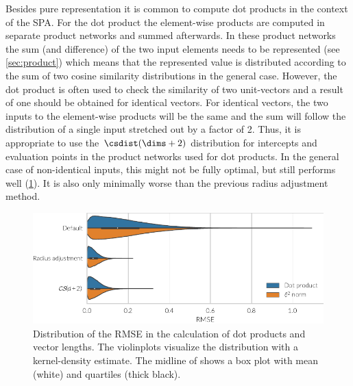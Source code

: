 Besides pure representation it is common to compute dot products in the context of the SPA\@.
For the dot product the element-wise products are computed in separate product networks and summed afterwards.
In these product networks the sum (and difference) of the two input elements needs to be represented (see \cref{sec:product}) which means that the represented value is distributed according to the sum of two cosine similarity distributions in the general case.
However, the dot product is often used to check the similarity of two unit-vectors and a result of one should be obtained for identical vectors.
For identical vectors, the two inputs to the element-wise products will be the same and the sum will follow the distribution of a single input stretched out by a factor of 2.
Thus, it is appropriate to use the $\csdist(\dims + 2)$ distribution for intercepts and evaluation points in the product networks used for dot products.
In the general case of non-identical inputs, this might not be fully optimal, but still performs well (\cref{fig:spaopt-dot}).
It is also only minimally worse than the previous radius adjustment method.
\begin{figure}
    \centering
    \includegraphics{figures/spaopt-dot}
    \caption[Distribution of the RMSE in dot product calculations]{Distribution of the RMSE in the calculation of dot products and vector lengths. The violinplots visualize the distribution with a kernel-density estimate. The midline of shows a box plot with mean (white) and quartiles (thick black).}\label{fig:spaopt-dot}
\end{figure}

